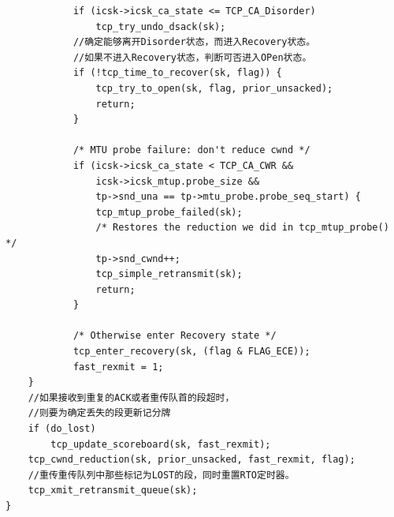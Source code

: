 \begin{verbatim}
			if (icsk->icsk_ca_state <= TCP_CA_Disorder)
				tcp_try_undo_dsack(sk);
			//确定能够离开Disorder状态，而进入Recovery状态。	
			//如果不进入Recovery状态，判断可否进入OPen状态。
			if (!tcp_time_to_recover(sk, flag)) {
				tcp_try_to_open(sk, flag, prior_unsacked);
				return;
			}

			/* MTU probe failure: don't reduce cwnd */
			if (icsk->icsk_ca_state < TCP_CA_CWR &&
				icsk->icsk_mtup.probe_size &&
				tp->snd_una == tp->mtu_probe.probe_seq_start) {
				tcp_mtup_probe_failed(sk);
				/* Restores the reduction we did in tcp_mtup_probe() */
				tp->snd_cwnd++;
				tcp_simple_retransmit(sk);
				return;
			}

			/* Otherwise enter Recovery state */
			tcp_enter_recovery(sk, (flag & FLAG_ECE));
			fast_rexmit = 1;
	}
	//如果接收到重复的ACK或者重传队首的段超时，
	//则要为确定丢失的段更新记分牌
	if (do_lost)
		tcp_update_scoreboard(sk, fast_rexmit);
	tcp_cwnd_reduction(sk, prior_unsacked, fast_rexmit, flag);
	//重传重传队列中那些标记为LOST的段，同时重置RTO定时器。	
	tcp_xmit_retransmit_queue(sk);
}

\end{verbatim}
	
	

